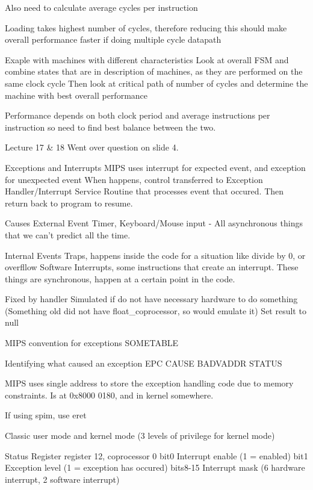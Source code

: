 \documentclass{article}
\begin{document}
	Also need to calculate average cycles per instruction

	Loading takes highest number of cycles, therefore reducing this should make overall performance faster if doing multiple cycle datapath

	Exaple with machines with different characteristics
		Look at overall FSM and combine states that are in description of machines, as they are performed on the same clock cycle
		Then look at critical path of number of cycles and determine the machine with best overall performance 

	Performance depends on both clock period and average instructions per instruction so need to find best balance between the two.

Lecture 17 \& 18
	Went over question on slide 4.

	Exceptions and Interrupts
		MIPS uses interrupt for expected event, and exception for unexpected event
		When happens, control transferred to Exception Handler/Interrupt Service Routine that processes event that occured.
		Then return back to program to resume.

		Causes
			External Event
				Timer, Keyboard/Mouse input - All asynchronous things that we can't predict all the time.

			Internal Events
				Traps, happens inside the code for a situation like divide by 0, or overfllow
				Software Interrupts, some instructions that create an interrupt.
				These things are synchronous, happen at a certain point in the code.

				Fixed by handler
				Simulated if do not have necessary hardware to do something (Something old did not have float\_coprocessor, so would emulate it)
				Set result to null

	MIPS convention for exceptions
		SOMETABLE


	Identifying what caused an exception
		EPC
		CAUSE
		BADVADDR
		STATUS

		MIPS uses single address to store the exception handling code due to memory constraints.
		Is at 0x8000 0180, and in kernel somewhere.

		If using spim, use eret

		Classic user mode and kernel mode (3 levels of privilege for kernel mode)

	Status Register
		register 12, coprocessor 0
		bit0	Interrupt enable (1 = enabled)
		bit1	Exception level (1 = exception has occured)
		bits8-15	Interrupt mask (6 hardware interrupt, 2 software interrupt)
\end{document}
